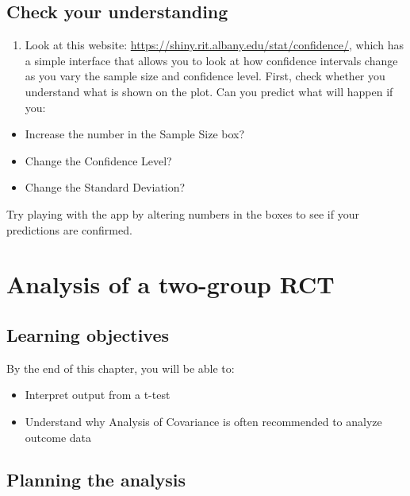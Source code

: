 \documentclass{krantz}
\providecommand{\tightlist}{%
\setlength{\itemsep}{0pt}\setlength{\parskip}{0pt}}
\begin{document}
\hypertarget{check-your-understanding-10}{%
\section{Check your understanding}\label{check-your-understanding-10}}

\begin{enumerate}
\def\labelenumi{\arabic{enumi}.}
\tightlist
\item
  Look at this website: \url{https://shiny.rit.albany.edu/stat/confidence/}, which has a simple interface that allows you to look at how confidence intervals change as you vary the sample size and confidence level. First, check whether you understand what is shown on the plot. Can you predict what will happen if you:
\end{enumerate}

\begin{itemize}
\tightlist
\item
  Increase the number in the Sample Size box?\\
\item
  Change the Confidence Level?\\
\item
  Change the Standard Deviation?
\end{itemize}

Try playing with the app by altering numbers in the boxes to see if your predictions are confirmed.

\hypertarget{analysis}{%
\chapter{Analysis of a two-group RCT}\label{analysis}}

\hypertarget{learning-objectives-9}{%
\section{Learning objectives}\label{learning-objectives-9}}

By the end of this chapter, you will be able to:

\begin{itemize}
\tightlist
\item
  Interpret output from a t-test
\item
  Understand why Analysis of Covariance is often recommended to analyze outcome data
\end{itemize}

\hypertarget{planning-the-analysis}{%
\section{Planning the analysis}\label{planning-the-analysis}}
\end{document}
